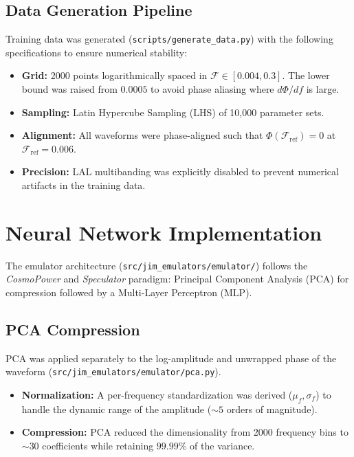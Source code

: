 \documentclass[11pt,a4paper]{article}
\begin{document}
\subsection{Data Generation Pipeline}
Training data was generated (\texttt{scripts/generate\_data.py}) with the following specifications to ensure numerical stability:
\begin{itemize}
    \item \textbf{Grid:} 2000 points logarithmically spaced in $\mathcal{F} \in [0.004, 0.3]$. The lower bound was raised from $0.0005$ to avoid phase aliasing where $d\Phi/df$ is large.
    \item \textbf{Sampling:} Latin Hypercube Sampling (LHS) of 10,000 parameter sets.
    \item \textbf{Alignment:} All waveforms were phase-aligned such that $\Phi(\mathcal{F}_{\text{ref}}) = 0$ at $\mathcal{F}_{\text{ref}} = 0.006$.
    \item \textbf{Precision:} LAL multibanding was explicitly disabled to prevent numerical artifacts in the training data.
\end{itemize}

\section{Neural Network Implementation}

The emulator architecture (\texttt{src/jim\_emulators/emulator/}) follows the \textit{CosmoPower} and \textit{Speculator} paradigm: Principal Component Analysis (PCA) for compression followed by a Multi-Layer Perceptron (MLP).

\subsection{PCA Compression}
PCA was applied separately to the log-amplitude and unwrapped phase of the waveform (\texttt{src/jim\_emulators/emulator/pca.py}).
\begin{itemize}
    \item \textbf{Normalization:} A per-frequency standardization was derived ($\mu_f, \sigma_f$) to handle the dynamic range of the amplitude ($\sim 5$ orders of magnitude).
    \item \textbf{Compression:} PCA reduced the dimensionality from 2000 frequency bins to $\sim 30$ coefficients while retaining $99.99\%$ of the variance.
\end{itemize}
\end{document}
